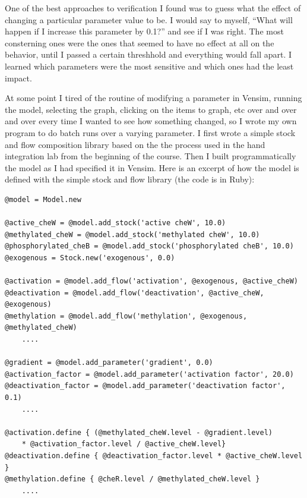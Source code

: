 \documentclass[12pt]{article}
\begin{document}
One of the best approaches to verification I found was to guess what the effect of changing a particular parameter value to be.  I would say to myself, ``What will happen if I increase this parameter by 0.1?'' and see if I was right.  The most consterning ones were the ones that seemed to have no effect at all on the behavior, until I passed a certain threshhold and everything would fall apart.  I learned which parameters were the most sensitive and which ones had the least impact.  

At some point I tired of the routine of modifying a parameter in Vensim, running the model, selecting the graph, clicking on the items to graph, etc over and over and over every time I wanted to see how something changed, so I wrote my own program to do batch runs over a varying parameter.  I first wrote a simple stock and flow composition library based on the the process used in the hand integration lab from the beginning of the course.  Then I built programmatically the model as I had specified it in Vensim.  Here is an excerpt of how the model is defined with the simple stock and flow library (the code is in Ruby):

\begin{verbatim}
@model = Model.new

@active_cheW = @model.add_stock('active cheW', 10.0)
@methylated_cheW = @model.add_stock('methylated cheW', 10.0)
@phosphorylated_cheB = @model.add_stock('phosphorylated cheB', 10.0)
@exogenous = Stock.new('exogenous', 0.0)

@activation = @model.add_flow('activation', @exogenous, @active_cheW)
@deactivation = @model.add_flow('deactivation', @active_cheW, @exogenous)
@methylation = @model.add_flow('methylation', @exogenous, @methylated_cheW)
    ....

@gradient = @model.add_parameter('gradient', 0.0)
@activation_factor = @model.add_parameter('activation factor', 20.0)
@deactivation_factor = @model.add_parameter('deactivation factor', 0.1)
    ....

@activation.define { (@methylated_cheW.level - @gradient.level) 
    * @activation_factor.level / @active_cheW.level}
@deactivation.define { @deactivation_factor.level * @active_cheW.level }
@methylation.define { @cheR.level / @methylated_cheW.level }
    ....
\end{verbatim}
\end{document}
